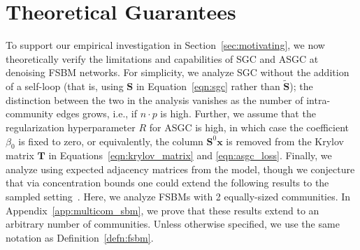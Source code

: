 \documentclass{article}
\newcommand{\Cam}[1]{\textcolor{blue}{Cam: #1}}
\begin{document}
\section{Theoretical Guarantees}\label{sec:theory}

To support our empirical investigation in Section~\ref{sec:motivating}, we now theoretically verify the limitations and capabilities of SGC and ASGC at denoising FSBM networks.
For simplicity, we analyze SGC without the addition of a self-loop (that is, using $\bm{S}$ in Equation~\ref{eqn:sgc} rather than $\tilde{\bm{S}}$); the distinction between the two in the analysis vanishes as the number of intra-community edges grows, i.e., if $n \cdot p$ is high.
Further, we assume that the regularization hyperparameter $R$ for ASGC is high, in which case the coefficient $\beta_0$ is fixed to zero, or equivalently, the column $\bm{S}^0 \bm{x}$ is removed from the Krylov matrix $\bm{T}$ in Equations~\ref{eqn:krylov_matrix} and \ref{eqn:asgc_loss}.
Finally, we analyze using expected adjacency matrices from the model, though we conjecture that via concentration bounds one could extend the following results to the sampled setting~\citep{spielman2012spectral}.
Here, we analyze FSBMs with 2 equally-sized communities. In Appendix~\ref{app:multicom_sbm}, we prove that these results extend to an arbitrary number of communities. Unless otherwise specified, we use the same notation as Definition~\ref{defn:fsbm}.
\end{document}
